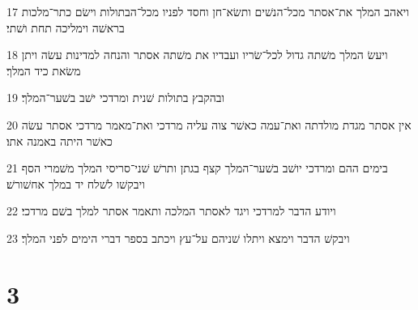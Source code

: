 \par 17 ויאהב המלך את־אסתר מכל־הנשׁים ותשׂא־חן וחסד לפניו מכל־הבתולות וישׂם כתר־מלכות בראשׁה וימליכה תחת ושׁתי׃
\par 18 ויעשׂ המלך משׁתה גדול לכל־שׂריו ועבדיו את משׁתה אסתר והנחה למדינות עשׂה ויתן משׂאת כיד המלך׃
\par 19 ובהקבץ בתולות שׁנית ומרדכי ישׁב בשׁער־המלך׃
\par 20 אין אסתר מגדת מולדתה ואת־עמה כאשׁר צוה עליה מרדכי ואת־מאמר מרדכי אסתר עשׂה כאשׁר היתה באמנה אתו׃
\par 21 בימים ההם ומרדכי יושׁב בשׁער־המלך קצף בגתן ותרשׁ שׁני־סריסי המלך משׁמרי הסף ויבקשׁו לשׁלח יד במלך אחשׁורשׁ׃
\par 22 ויודע הדבר למרדכי ויגד לאסתר המלכה ותאמר אסתר למלך בשׁם מרדכי׃
\par 23 ויבקשׁ הדבר וימצא ויתלו שׁניהם על־עץ ויכתב בספר דברי הימים לפני המלך׃

\chapter{3}

